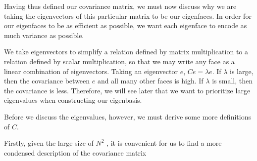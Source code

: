 \documentclass[12pt]{report}
\begin{document}
            
            Having thus defined our covariance matrix, we must now discuss why we are taking the eigenvectors of this particular matrix to be our eigenfaces. In order for our eigenfaces to be as efficient as possible, we want each eigenface to encode as much variance as possible. 
            
            We take eigenvectors to simplify a relation defined by matrix multiplication to a relation defined by scalar multiplication, so that we may write any face as a linear combination of eigenvectors. Taking an eigenvector $e$, $C e = \lambda e$. If $\lambda$ is large, then the covariance between $e$ and all many other faces is high. If $\lambda$ is small, then the covariance is less. Therefore, we will see later that we want to prioritize large eigenvalues when constructing our eigenbasis. 
            
            Before we discuss the eigenvalues, however, we must derive some more definitions of $C$.
            
            Firstly, given the large size of $N^2$  , it is convenient for us to find a more condensed description of the covariance matrix
    
\end{document}
